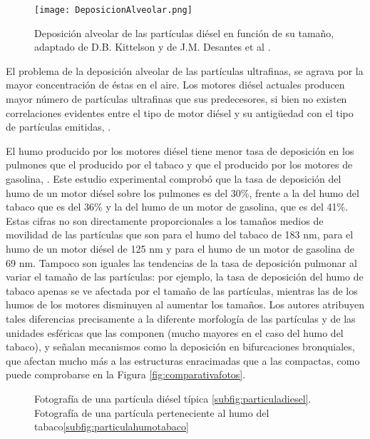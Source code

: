 \begin{figure}[ht]
\centering
	\texttt{[image: DeposicionAlveolar.png]}	 
	\caption{Deposición alveolar de las partículas diésel en función de su tamaño, adaptado de D.B. Kittelson \cite{kittleson:1998} y de J.M. Desantes et al \cite{desantesetal:2005}.} \label{fig:deposicionalveolar}
\end{figure} 

\par El problema de la deposición alveolar de las partículas ultrafinas, se agrava por la mayor concentración de éstas en el aire. Los motores diésel actuales producen mayor número de partículas ultrafinas que sus predecesores, si bien no existen correlaciones evidentes entre el tipo de motor diésel y su antigüedad con el tipo de partículas emitidas, \cite{morawskaetal:1998}.

\par El humo producido por los motores diésel tiene menor tasa de deposición en los pulmones que el producido por el tabaco y que el producido por los motores de gasolina, \cite{morawskaetal:1998}. Este estudio experimental comprobó que la tasa de deposición del humo de un motor diésel sobre los pulmones es del 30\%, frente a la del humo del tabaco que es del 36\% y la del humo de un motor de gasolina, que es del 41\%. Estas cifras no son directamente proporcionales a los tamaños medios de movilidad de las partículas que son para el humo del tabaco de 183 nm, para el humo de un motor diésel de 125 nm y para el humo de un motor de gasolina de 69 nm. Tampoco son iguales las tendencias de la tasa de deposición pulmonar al variar el tamaño de las partículas: por ejemplo, la tasa de deposición del humo de tabaco apenas se ve afectada por el tamaño de las partículas, mientras las de los humos de los motores disminuyen al aumentar los tamaños. Los autores atribuyen tales diferencias precisamente a la diferente morfología de las partículas y de las unidades esféricas que las componen (mucho mayores en el caso del humo del tabaco), y señalan mecanismos como la deposición en bifurcaciones bronquiales, que afectan mucho más a las estructuras enracimadas que a las compactas, como puede comprobarse en la Figura \ref{fig:comparativafotos}.
  
\begin{figure}[ht]
\centering
	 \qquad
	 \caption{Fotografía de una partícula diésel típica \ref{subfig:particuladiesel}. Fotografía de una partícula perteneciente al humo del tabaco\ref{subfig:particulahumotabaco}}
\end{figure} \label{fig:comparativafotos}

